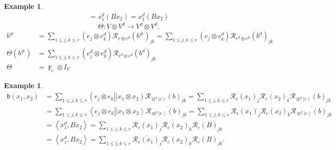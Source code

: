 \documentclass[aps,preprint]{revtex4}%
\newtheorem{example}[theorem]{Example}
\begin{document}
\begin{example}
\begin{align}
=x_{1}^{d}\left(  Bx_{2}\right)  =x_{1}^{d}\left(  Bx_{2}\right)
\end{align}%
\begin{equation}
\Theta:V\otimes V^{d}\rightarrow V^{d}\otimes V^{d}.
\end{equation}%
\begin{align}
b^{\#}  &  =\sum_{1\leq j,k\leq r}\left(  e_{j}\otimes e_{k}^{d}\right)
\mathcal{R}_{e\otimes e^{d}}\left(  b^{\#}\right)  _{jk}=\sum_{1\leq j,k\leq
r}\left(  e_{j}\otimes e_{k}^{d}\right)  \mathcal{R}_{e^{d}\otimes e^{d}%
}\left(  b^{d}\right)  _{jk}\\
\Theta\left(  b^{\#}\right)   &  =\sum_{1\leq j,k\leq r}\left(  e_{j}%
^{d}\otimes e_{k}^{d}\right)  \mathcal{R}_{e^{d}\otimes e^{d}}\left(
b^{d}\right)  _{jk}\\
\Theta &  =\digamma_{e}\otimes I_{V}%
\end{align}

\end{example}

\begin{example}%
\begin{align}
\mathfrak{b}\left(  x_{1},x_{2}\right)   &  =\sum_{1\leq j,k\leq r}\left(
e_{j}\otimes e_{k}\right\vert \left\vert x_{1}\otimes x_{2}\right)
\mathcal{R}_{\otimes^{2}\left\vert e\right)  }\left(  b\right)  _{jk}%
=\sum_{1\leq j,k\leq r}\mathcal{R}_{e}\left(  x_{1}\right)  _{j}%
\mathcal{R}_{e}\left(  x_{2}\right)  _{k}\mathcal{R}_{\otimes^{2}\left\vert
e\right)  }\left(  b\right)  _{jk}\\
&  =\sum_{1\leq j,k\leq r}\left\langle e_{j}\otimes e_{k}\right\vert
\left\vert x_{1}\otimes x_{2}\right\rangle \overline{\mathcal{R}_{\otimes
^{2}\left\vert e\right\rangle }\left(  b\right)  _{jk}}=\sum_{1\leq j,k\leq
r}\mathcal{R}_{e}\left(  x_{1}\right)  _{j}\mathcal{R}_{e}\left(
x_{2}\right)  _{k}\overline{\mathcal{R}_{\otimes^{2}\left\vert e\right\rangle
}\left(  b\right)  _{jk}}\\
&  =\left\langle x_{1}^{d},Bx_{2}\right\rangle =\sum_{1\leq j,k\leq
r}\mathcal{R}_{e}\left(  x_{1}\right)  _{j}\mathcal{R}_{e}\left(
x_{2}\right)  _{k}\mathcal{R}_{e}\left(  B\right)  _{jk}\\
&  =\left\langle x_{1}^{d},Bx_{2}\right\rangle =\sum_{1\leq j,k\leq
r}\overline{\mathcal{R}_{e}\left(  x_{1}\right)  _{j}}\mathcal{R}_{e}\left(
x_{2}\right)  _{k}\mathcal{R}_{e}\left(  B\right)  _{jk}.
\end{align}

\end{example}
\end{document}
